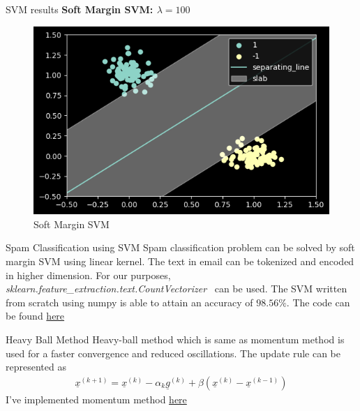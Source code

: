 \documentclass{beamer}
\renewcommand{\vec}[1]{\underline{#1}}
\begin{document}
\begin{frame}{SVM results}
    \textbf{Soft Margin SVM: $\lambda = 100$}
    \begin{figure}[H]
        \centering
        \includegraphics[scale=0.5]{../../results/softmargin.png}
        \caption{Soft Margin SVM}
        \label{softmargin}
    \end{figure}
\end{frame}

\begin{frame}{Spam Classification using SVM}
    Spam classification problem can be solved by soft margin SVM using linear kernel. The text in email can be tokenized and encoded in higher dimension. For our purposes, \emph{sklearn.feature\_extraction.text.CountVectorizer}~\cite{scikit-learn} can be used. The SVM written from scratch using numpy is able to attain an accuracy of $98.56\%$. The code can be found \href{https://github.com/cmaspi/subgradient\_method/blob/main/code/spam\_classification.ipynb}{here}
\end{frame}    

\begin{frame}{Heavy Ball Method}
    Heavy-ball method which is same as momentum method is used for a faster convergence and reduced oscillations. The update rule can be represented as
    \begin{align}
        \vec{x}^{(k+1)} = \vec{x}^{(k)} - \alpha_k\vec{g}^{(k)} + \beta\left(\vec{x}^{(k)}-\vec{x}^{(k-1)}\right)
    \end{align}
    I've implemented momentum method \href{https://github.com/cmaspi/subgradient_method/blob/main/code/svm_numpy.py}{here}
\end{frame}

{\small


}


\end{document}
